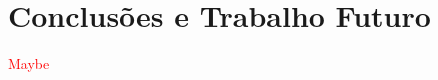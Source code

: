 \documentclass[a4paper,12pt]{scrreprt}
\begin{document}
\chapter{Conclusões e Trabalho Futuro}
    \textcolor{red}{
        Maybe
    }







\renewcommand{\nomname}{Lista de Siglas e Acrónimos}

\renewcommand{\nompreamble}{
    \textcolor{red}{
        <<Apresentar uma lista com todas as siglas e acrónimos utilizados durante a realização do trabalho. O formato base para esta lista deverá ser da forma como abaixo se apresenta.>>
    }
}


\printnomenclature

\end{document}
